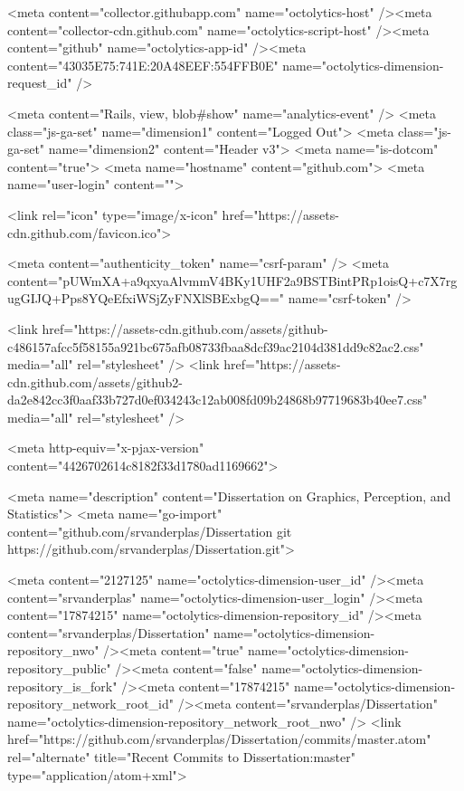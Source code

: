     <meta content="collector.githubapp.com" name="octolytics-host" /><meta content="collector-cdn.github.com" name="octolytics-script-host" /><meta content="github" name="octolytics-app-id" /><meta content="43035E75:741E:20A48EEF:554FFB0E" name="octolytics-dimension-request_id" />
    
    <meta content="Rails, view, blob#show" name="analytics-event" />
    <meta class="js-ga-set" name="dimension1" content="Logged Out">
    <meta class="js-ga-set" name="dimension2" content="Header v3">
    <meta name="is-dotcom" content="true">
    <meta name="hostname" content="github.com">
    <meta name="user-login" content="">

    
    <link rel="icon" type="image/x-icon" href="https://assets-cdn.github.com/favicon.ico">


    <meta content="authenticity_token" name="csrf-param" />
<meta content="pUWmXA+a9qxyaAlvmmV4BKy1UHF2a9BSTBintPRp1oisQ+c7X7rgugGIJQ+Pps8YQeEfxiWSjZyFNXlSBExbgQ==" name="csrf-token" />

    <link href="https://assets-cdn.github.com/assets/github-c486157afcc5f58155a921bc675afb08733fbaa8dcf39ac2104d381dd9c82ac2.css" media="all" rel="stylesheet" />
    <link href="https://assets-cdn.github.com/assets/github2-da2e842cc3f0aaf33b727d0ef034243c12ab008fd09b24868b97719683b40ee7.css" media="all" rel="stylesheet" />
    
    


    <meta http-equiv="x-pjax-version" content="4426702614c8182f33d1780ad1169662">

      
  <meta name="description" content="Dissertation on Graphics, Perception, and Statistics">
  <meta name="go-import" content="github.com/srvanderplas/Dissertation git https://github.com/srvanderplas/Dissertation.git">

  <meta content="2127125" name="octolytics-dimension-user_id" /><meta content="srvanderplas" name="octolytics-dimension-user_login" /><meta content="17874215" name="octolytics-dimension-repository_id" /><meta content="srvanderplas/Dissertation" name="octolytics-dimension-repository_nwo" /><meta content="true" name="octolytics-dimension-repository_public" /><meta content="false" name="octolytics-dimension-repository_is_fork" /><meta content="17874215" name="octolytics-dimension-repository_network_root_id" /><meta content="srvanderplas/Dissertation" name="octolytics-dimension-repository_network_root_nwo" />
  <link href="https://github.com/srvanderplas/Dissertation/commits/master.atom" rel="alternate" title="Recent Commits to Dissertation:master" type="application/atom+xml">

